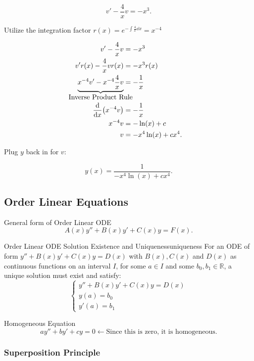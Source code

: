 \documentclass[../notes.tex]{subfiles}
\begin{document}
\[
v' - \frac{4}{x} v = -x^3
.\]


Utilize the integration factor $\displaystyle r( x ) = e^{-\int \frac{4}{x} \dd x} = x^{-4}$

\begin{align*}
				v' - \frac{4}{x} v &= -x^3 \\
				v'r( x ) - \frac{4}{x} v r( x )  &= -x^3 r( x ) \\
				\underbrace{x^{-4}v' - x^{-4}\frac{4}{x} v}_{\clap{Inverse Product Rule}}  &= -\frac{1}{x} \\
				\dv{x} ( x^{-4} v ) &= -\frac{1}{x} \\
				x^{-4} v &= -\ln( x ) + c\\
				v &= -x^{4} \ln( x ) + cx^{4}
.\end{align*}


Plug $y$ back in for $v$:

\[
				\boxed{y(x) = \frac{1}{-x^{4}\ln( x ) + cx^{4}}.}
\]

\subsection{ Order Linear Equations}

\begin{stickynote}{General form of  Order Linear ODE}
				\[
				A( x ) y'' + B( x ) y' + C( x ) y = F( x )
				.\]
\end{stickynote}
\begin{theorem}{ Order Linear ODE Solution Existence and Uniqueness}{uniqueness}
For an ODE of form $y'' + B(x) y' + C(x) y = D(x)$ with $B(x),C(x)$ and $D(x)$ as continuous functions on an interval $I$, for some  $a \in I$ and some ${b_0,b_1} \in \mathbb{R}$, a unique solution must exist and satisfy:
\[
\begin{cases}
				y'' + B(x)y' + C(x)y = D(x) \\
				y(a) = b_0 \\
				y'(a) = b_1
\end{cases}
\]
\end{theorem}
\begin{stickynote}{Homogeneous Equation}
				\[
				ay'' + by' + cy = 0 \leftarrow \text{Since this is zero, it is homogeneous}
				.\]
\end{stickynote}

\subsubsection{Superposition Principle}
\end{document}
